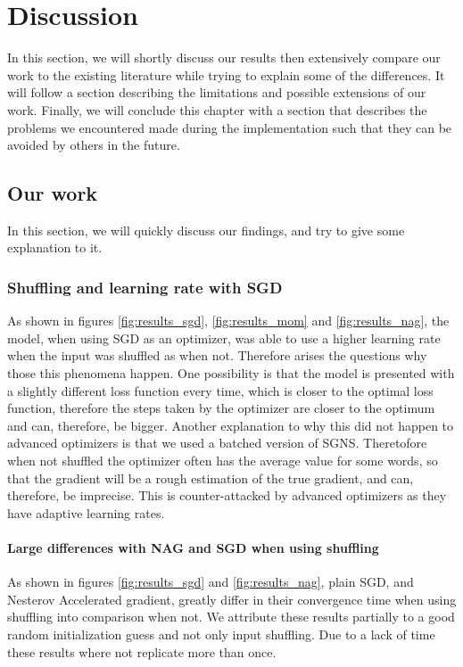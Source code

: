 \chapter{Discussion}\label{chap:discussion}



In this section, we will shortly discuss our results then extensively compare our work to the existing literature while trying to explain some of the differences. It will follow a section describing the limitations and possible extensions of our work. Finally, we will conclude this chapter with a section that describes the problems we encountered made during the implementation such that they can be avoided by others in the future.

\section{Our work}
In this section, we will quickly discuss our findings, and try to give some explanation to it.  
\subsection{Shuffling and learning rate with SGD}
As shown in figures \ref{fig:results_sgd}, \ref{fig:results_mom} and \ref{fig:results_nag}, the model, when using SGD as an optimizer,  was able to use a higher learning rate when the input was shuffled as when not. Therefore arises the questions why those this phenomena happen. One possibility is that the model is presented with a slightly different loss function every time, which is closer to the optimal loss function, therefore the steps taken by the optimizer are closer to the optimum and can, therefore, be bigger. Another explanation to why this did not happen to advanced optimizers is that we used a batched version of SGNS. Theretofore when not shuffled the optimizer often has the average value for some words, so that the gradient will be a rough estimation of the true gradient, and can, therefore, be imprecise. This is counter-attacked by advanced optimizers as they have adaptive learning rates.
\subsubsection{Large differences with NAG and SGD when using shuffling}
As shown in figures \ref{fig:results_sgd} and \ref{fig:results_nag}, plain SGD, and Nesterov Accelerated gradient, greatly differ in their convergence time when using shuffling into comparison when not. We attribute these results partially to a good random initialization guess and not only input shuffling. Due to a lack of time these results where not replicate more than once. 

